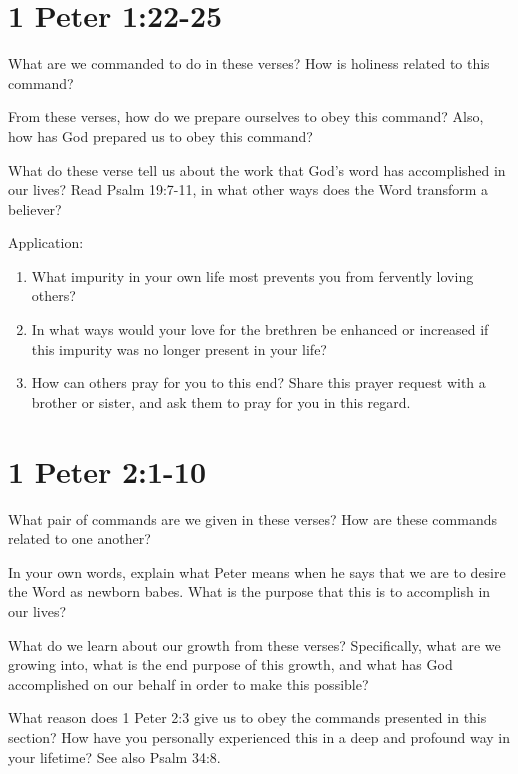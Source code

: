 \documentclass{article}
\newcommand{\answerbox}{\vspace{1.5cm}}
\newcommand{\BE}{\begin{enumerate}}
\newcommand{\EE}{\end{enumerate}}
\newcommand{\I}{\item}
\begin{document}
\section*{1 Peter 1:22-25}
\I  What are we commanded to do in these verses?
    How is holiness related to this command?
    \answerbox
\I  From these verses, how do we prepare ourselves to obey this command?
    Also, how has God prepared us to obey this command?
    \answerbox
\I  What do these verse tell us about the work that God's word 
        has accomplished in our lives?
    Read Psalm 19:7-11, in what other ways does the Word transform a believer?
    \answerbox
\I  Application:
    \BE
    \I  What impurity in your own life most prevents you from 
            fervently loving others?
    \answerbox
    \I  In what ways would your love for the brethren be enhanced or increased
            if this impurity was no longer present in your life?
    \answerbox
    \I  How can others pray for you to this end?
        Share this prayer request with a brother or sister,
            and ask them to pray for you in this regard.
    \answerbox
    \EE
\section*{1 Peter 2:1-10}
\I  What pair of commands are we given in these verses?
    How are these commands related to one another?
    \answerbox
\I  In your own words, explain what Peter means when he says
        that we are to desire the Word as newborn babes.
    What is the purpose that this is to accomplish in our lives?
    \answerbox
\I  What do we learn about our growth from these verses?
    Specifically, what are we growing into,
        what is the end purpose of this growth, and
        what has God accomplished on our behalf in order to make this possible?
    \answerbox
\I  What reason does 1 Peter 2:3 give us to obey the commands presented 
        in this section? 
    How have you personally experienced this in a deep and profound way 
        in your lifetime?
    See also Psalm 34:8.
    \answerbox
\end{document}
